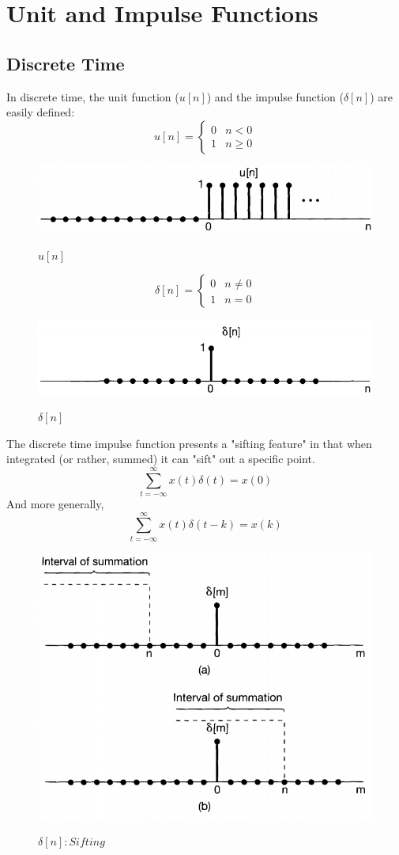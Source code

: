 \documentclass[a4paper,12pt]{article}
\begin{document}
\section{Unit and Impulse Functions}
\subsection{Discrete Time}
In discrete time, the unit function ($u[n]$) and the impulse function ($\delta[n]$) are easily defined:
\[u[n]=\begin{cases}
	0 & n<0 \\
	1 & n\geq0
\end{cases}
\]
\begin{figure}[ht]
	\centering
	\includegraphics[width=.5\textwidth]{dcUnitStep}
	\label{dcUnitStep}
	\caption{$u[n]$}
\end{figure}
\[\delta[n]= \begin{cases} 
      0 & n\neq 0 \\
      1 & n=0 
   \end{cases}
\]
\begin{figure}[ht]
	\centering
	\includegraphics[width=.5\textwidth]{dcImpulse}
	\label{dcImpulse}
	\caption{$\delta[n]$}
\end{figure}
The discrete time impulse function presents a "sifting feature" in that when integrated (or rather, summed) it can "sift" out a specific point.
$$\sum_{t=-\infty}^\infty x(t)\delta(t)=x(0)$$
And more generally,
$$\sum_{t=-\infty}^\infty x(t)\delta(t-k)=x(k)$$

\begin{figure}[ht]
	\centering
	\includegraphics[width=.5\textwidth]{dcImpulse-Shifting}
	\label{dcImpulse-Shifting}
	\caption{$\delta[n]: Sifting$}
\end{figure}
\end{document}
